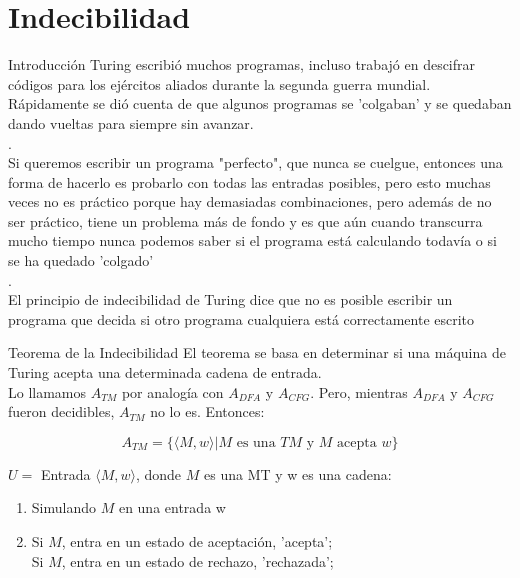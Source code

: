 \documentclass[11pt]{beamer}
\begin{document}
	\section{Indecibilidad}
		\begin{frame}{Introducción}
			\justifying
			Turing escribió muchos programas, incluso trabajó en descifrar códigos para los ejércitos aliados durante la segunda guerra mundial. Rápidamente se dió cuenta de que algunos programas se 'colgaban' y se quedaban dando vueltas para siempre sin avanzar.\\ .
			\\
			Si queremos escribir un programa "perfecto", que nunca se cuelgue, entonces una forma de hacerlo es probarlo con todas las entradas posibles, pero esto muchas veces no es práctico porque hay demasiadas combinaciones, pero además de no ser práctico, tiene un problema más de fondo y es que aún cuando transcurra mucho tiempo nunca podemos saber si el programa está calculando todavía o si se ha quedado 'colgado'\\ .
			\\
			El principio de indecibilidad de Turing dice que no es posible escribir un programa que decida si otro programa cualquiera está correctamente escrito
		\end{frame}
		

		
		
		\begin{frame}{Teorema de la Indecibilidad}
			\justifying
			El teorema se basa en determinar si una máquina de Turing acepta una determinada cadena de entrada.\\
			Lo llamamos $A_{TM}$ por analogía con $A_{DFA}$ y $A_{CFG}$. Pero, mientras
            $A_{DFA}$ y $A_{CFG}$ fueron decidibles, $A_{TM}$ no lo es. Entonces:
            
			\begin{equation}
			    A_{TM} = \{ \langle M,w \rangle | M \text{ es una } TM \text{ y } M \text{ acepta } w \}
			\end{equation}
			
			$U=$ Entrada $\langle M,w \rangle$, donde $M$ es una MT y w es una cadena:
		    
		    \begin{enumerate}
		        \item Simulando $M$ en una entrada w
		        \item Si $M$, entra en un estado de aceptación, 'acepta'; \\
		        Si $M$, entra en un estado de rechazo, 'rechazada';
		    \end{enumerate}
			
		\end{frame}
		
\end{document}
